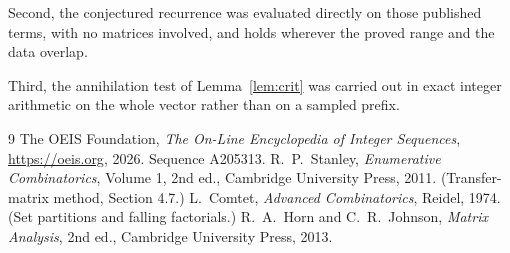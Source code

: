 \documentclass[11pt,a4paper]{article}
\theoremstyle{plain}
\theoremstyle{definition}
\begin{document}
Second, the conjectured recurrence was evaluated directly on those published terms, with no
matrices involved, and holds wherever the proved range and the data overlap.

Third, the annihilation test of Lemma~\ref{lem:crit} was carried out in exact integer
arithmetic on the whole vector rather than on a sampled prefix.

\begin{thebibliography}{9}
 The OEIS Foundation, \emph{The On-Line Encyclopedia of Integer
Sequences}, \url{https://oeis.org}, 2026. Sequence A205313.
 R.~P.~Stanley, \emph{Enumerative Combinatorics}, Volume 1, 2nd ed.,
Cambridge University Press, 2011. (Transfer-matrix method, Section 4.7.)
 L.~Comtet, \emph{Advanced Combinatorics}, Reidel, 1974. (Set partitions
and falling factorials.)
 R.~A.~Horn and C.~R.~Johnson, \emph{Matrix Analysis}, 2nd ed., Cambridge
University Press, 2013.
\end{thebibliography}
\end{document}
